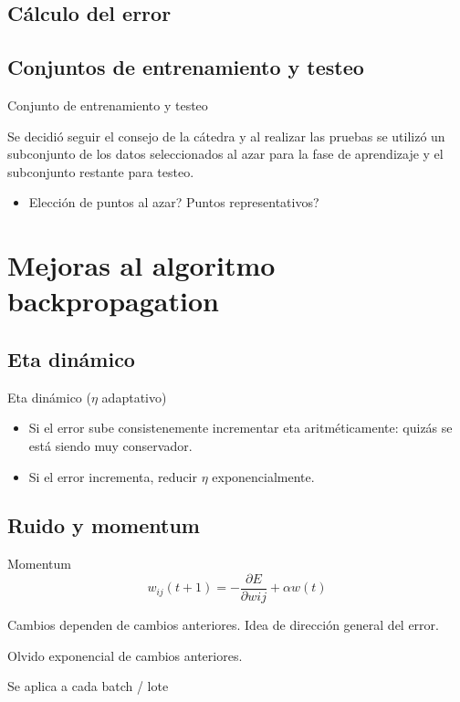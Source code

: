 \documentclass{beamer}
\begin{document}
\subsection{Cálculo del error}

\subsection{Conjuntos de entrenamiento y testeo}
\begin{frame}{Conjunto de entrenamiento y testeo}
\par Se decidió seguir el consejo de la cátedra y al realizar las pruebas se utilizó un subconjunto de los datos seleccionados al azar para la fase de aprendizaje y el subconjunto restante para testeo.

\begin{itemize}
\item Elección de puntos al azar? Puntos representativos?
\end{itemize}
\end{frame}

\section{Mejoras al algoritmo backpropagation}

\subsection{Eta dinámico}
\begin{frame}{Eta dinámico ($\eta$ adaptativo)}
\begin{itemize}
\item Si el error sube consistenemente incrementar eta aritméticamente: quizás se está siendo muy conservador.
\item Si el error incrementa, reducir $\eta$ exponencialmente.
\end{itemize}
\end{frame}

\subsection{Ruido y momentum}
\begin{frame}{Momentum}
\[w_{ij}(t+1)= - \frac{\partial E}{\partial w{ij}} + \alpha w(t)\]
\par Cambios dependen de cambios anteriores. Idea de dirección general del error. 
\par Olvido exponencial de cambios anteriores.
\par Se aplica a cada batch / lote
\end{frame}
\end{document}
